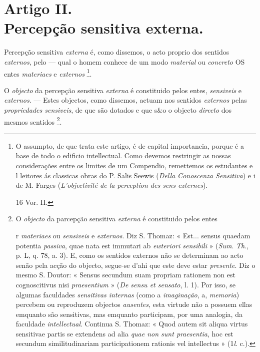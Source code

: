 
\section*{Artigo II.\\ Percepção sensitiva externa.}


Percepção sensitiva \emph{externa} é, como dissemos, o acto proprio dos sentidos \emph{externos}, pelo --- qual o homem conhece de um modo \emph{material} ou \emph{concreto} OS entes \emph{materiaes} e \emph{externos} \footnote{O assumpto, de que trata este artigo, é de capital importancia, porque é a base de todo o edificio intellectual. Como devemos restringir as nossas considerações entre os limites de um Compendio, remettemos os estudantes e l leitores ás classicas obras do P. Salis Seewis (\emph{Della Conoscenza Sensitiva}) e i de M. Farges (\emph{L'objectivité de la perception des sens externes}).\par 16 Vor. II.}.


O \emph{objecto} da percepção sensitiva \emph{externa} é constituido pelos entes, \emph{sensiveis} e \emph{externos}. --- Estes objectos, como dissemos, actuam nos sentidos   \emph{externos} pelas \emph{propriedades sensiveis}, de que são dotados e que s\&o o objecto \emph{directo} dos mesmos sentidos \footnote{O \emph{objecto} da parcepção sensitiva \emph{externa} é constituido pelos entes\par r \emph{materiaes} ou \emph{sensiveis} e \emph{externos}. Diz S. Thomaz: « Est... sensus quaedam potentia \emph{passiva}, quae nata est immutari ab \emph{ewteriori sensibili} » (\emph{Sum}. \emph{Th}., p. L, q. 78, a. 3). E, como os sentidos externos não se determinam ao acto senão pela acção do objecto, segue-se d'ahi que este deve estar \emph{presente}. Diz o mesmo S. Doutor: « Sensus secundum suam propriam rationem non est cognoscitivus nisi \emph{praesentium} » (\emph{De sensu et sensato}, l. 1). Por isso, se algumas faculdades \emph{sensitivas internas} (como a \emph{imaginação}, a, \emph{memoria}) percebem ou reproduzem objectos \emph{ausentes}, esta virtude não a possuem ellas emquanto são sensitivas, mas emquanto participam, por uma analogia, da faculdade \emph{intellectual}. Continua S. Thomaz: « Quod autem sit aliqua virtus sensitivae partis se extendens ad alia \emph{quae non sunt praesentia}, hoc est secundum similitudinariam participationem rationis vel intellectus » (1\emph{l}. c.).}.

